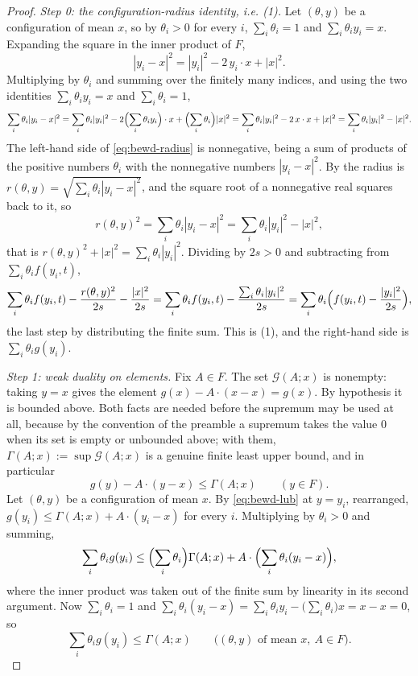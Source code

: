 \begin{proof}
\emph{Step 0: the configuration-radius identity, i.e. (1).}
Let $(\theta,y)$ be a configuration of mean $x$, so by 
$\theta_i>0$ for every $i$, $\sum_i\theta_i=1$ and $\sum_i\theta_iy_i=x$.
Expanding the square in the inner product of $F$,
\[
  |y_i-x|^2=|y_i|^2-2\,y_i\cdot x+|x|^2 .
\]
Multiplying by $\theta_i$ and summing over the finitely many indices, and using
the two identities $\sum_i\theta_iy_i=x$ and $\sum_i\theta_i=1$,
\begin{equation}\label{eq:bewd-radius}
  \sum_i\theta_i|y_i-x|^2
   =\sum_i\theta_i|y_i|^2-2\Bigl(\sum_i\theta_iy_i\Bigr)\cdot x
      +\Bigl(\sum_i\theta_i\Bigr)|x|^2
   =\sum_i\theta_i|y_i|^2-2\,x\cdot x+|x|^2
   =\sum_i\theta_i|y_i|^2-|x|^2 .
\end{equation}
The left-hand side of \eqref{eq:bewd-radius} is nonnegative, being a sum of
products of the positive numbers $\theta_i$ with the nonnegative numbers
$|y_i-x|^2$. By  the radius is
$r(\theta,y)=\sqrt{\sum_i\theta_i|y_i-x|^2}$, and the square root of a
nonnegative real squares back to it, so
\[
  r(\theta,y)^2=\sum_i\theta_i|y_i-x|^2=\sum_i\theta_i|y_i|^2-|x|^2 ,
\]
that is $r(\theta,y)^2+|x|^2=\sum_i\theta_i|y_i|^2$. Dividing by $2s>0$ and
subtracting from $\sum_i\theta_if(y_i,t)$,
\[
  \sum_i\theta_if(y_i,t)-\frac{r(\theta,y)^2}{2s}-\frac{|x|^2}{2s}
   =\sum_i\theta_if(y_i,t)-\frac{\sum_i\theta_i|y_i|^2}{2s}
   =\sum_i\theta_i\Bigl(f(y_i,t)-\frac{|y_i|^2}{2s}\Bigr),
\]
the last step by distributing the finite sum. This is (1), and the right-hand
side is $\sum_i\theta_ig(y_i)$.

\emph{Step 1: weak duality on elements.}
Fix $A\in F$. The set $\mathcal G(A;x)$ is nonempty: taking $y=x$ gives the
element $g(x)-A\cdot(x-x)=g(x)$. By hypothesis it is bounded above. Both facts
are needed before the supremum may be used at all, because by the convention of
the preamble a supremum takes the value $0$ when its set is empty or unbounded
above; with them, $\Gamma(A;x):=\sup\mathcal G(A;x)$ is a genuine finite least
upper bound, and in particular
\begin{equation}\label{eq:bewd-lub}
  g(y)-A\cdot(y-x)\le\Gamma(A;x)\qquad(y\in F).
\end{equation}
Let $(\theta,y)$ be a configuration of mean $x$. By \eqref{eq:bewd-lub} at
$y=y_i$, rearranged, $g(y_i)\le\Gamma(A;x)+A\cdot(y_i-x)$ for every $i$.
Multiplying by $\theta_i>0$ and summing,
\[
  \sum_i\theta_ig(y_i)
   \le\Bigl(\sum_i\theta_i\Bigr)\Gamma(A;x)
      +A\cdot\Bigl(\sum_i\theta_i(y_i-x)\Bigr),
\]
where the inner product was taken out of the finite sum by linearity in its
second argument. Now $\sum_i\theta_i=1$ and
$\sum_i\theta_i(y_i-x)=\sum_i\theta_iy_i-\bigl(\sum_i\theta_i\bigr)x=x-x=0$, so
\begin{equation}\label{eq:bewd-weak}
  \sum_i\theta_ig(y_i)\le\Gamma(A;x)
  \qquad\bigl((\theta,y)\text{ of mean }x,\ A\in F\bigr).
\end{equation}


\end{proof}
